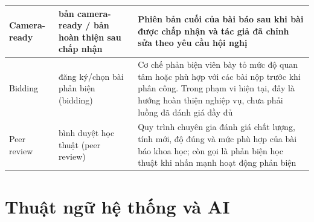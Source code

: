 \begin{longtable}{|C{0.16\textwidth}|P{0.22\textwidth}|P{0.55\textwidth}|}
  Camera-\allowbreak ready      &      bản camera-\allowbreak ready / bản hoàn thiện sau chấp nhận      &      Phiên bản cuối của bài báo sau khi bài được chấp nhận và tác giả đã chỉnh sửa theo yêu cầu hội nghị \\ \hline
  Bidding     &     đăng ký/chọn bài phản biện (bidding)     &     Cơ chế phản biện viên bày tỏ mức độ quan tâm hoặc phù hợp với các bài nộp trước khi phân công. Trong phạm vi hiện tại, đây là hướng hoàn thiện nghiệp vụ, chưa phải luồng đã đánh giá đầy đủ \\ \hline
  Peer review      &      bình duyệt học thuật (peer review)      &      Quy trình chuyên gia đánh giá chất lượng, tính mới, độ đúng và mức phù hợp của bài báo khoa học; còn gọi là phản biện học thuật khi nhấn mạnh hoạt động phản biện \\ \hline
\end{longtable}
\endgroup

\section*{Thuật ngữ hệ thống và AI}

